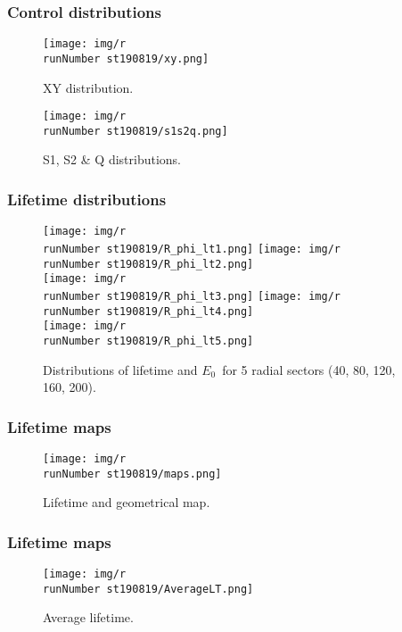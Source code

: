 \begin{frame}
\frametitle{Control distributions}
\begin{figure}
  \begin{center}
      \texttt{[image: img/r\\runNumber st190819/xy.png]}
    \caption{XY distribution.}
  \end{center}
\end{figure}
\end{frame}

\begin{frame}
\begin{figure}
  \begin{center}
      \texttt{[image: img/r\\runNumber st190819/s1s2q.png]}
    \caption{S1, S2 \& Q distributions.}
  \end{center}
\end{figure}
\end{frame}

\begin{frame}
\frametitle{Lifetime distributions}
\begin{figure}
  \begin{center}
      \texttt{[image: img/r\\runNumber st190819/R\_phi\_lt1.png]}
      \texttt{[image: img/r\\runNumber st190819/R\_phi\_lt2.png]} \\
      \texttt{[image: img/r\\runNumber st190819/R\_phi\_lt3.png]}
      \texttt{[image: img/r\\runNumber st190819/R\_phi\_lt4.png]}\\
      \texttt{[image: img/r\\runNumber st190819/R\_phi\_lt5.png]}
    \caption{Distributions of lifetime and $E_0$~for 5 radial sectors (40, 80, 120, 160, 200).}
  \end{center}
\end{figure}
\end{frame}

\begin{frame}
\frametitle{Lifetime maps}
\begin{figure}
  \begin{center}
      \texttt{[image: img/r\\runNumber st190819/maps.png]}
    \caption{Lifetime and geometrical map.}
  \end{center}
\end{figure}
\end{frame}

\begin{frame}
\frametitle{Lifetime maps}
\begin{figure}
  \begin{center}
      \texttt{[image: img/r\\runNumber st190819/AverageLT.png]}
    \caption{Average lifetime.}
  \end{center}
\end{figure}
\end{frame}

